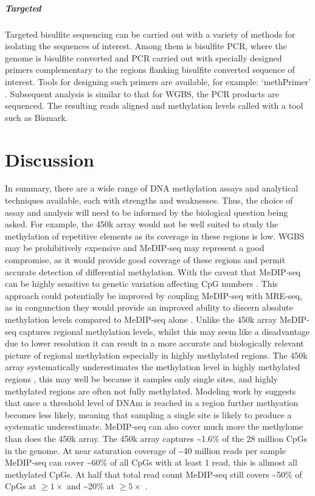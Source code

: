 \documentclass[]{book}
\let\oldsubparagraph\subparagraph
\renewcommand{\subparagraph}[1]{\oldsubparagraph{#1}\mbox{}}
\begin{document}
\hypertarget{targeted}{%
\subparagraph{Targeted}\label{targeted}}

Targeted bisulfite sequencing can be carried out with a variety of methods for isolating the sequences of interest. Among them is bisulfite PCR, where the genome is bisulfite converted and PCR carried out with specially designed primers complementary to the regions flanking bisulfite converted sequence of interest. Tools for designing such primers are available, for example: `methPrimer' \citep{Li2002}. Subsequent analysis is similar to that for WGBS, the PCR products are sequenced. The resulting reads aligned and methylation levels called with a tool such as Bismark.

\hypertarget{discussion}{%
\section{Discussion}\label{discussion}}

In summary, there are a wide range of DNA methylation assays and analytical techniques available, each with strengths and weaknesses. Thus, the choice of assay and analysis will need to be informed by the biological question being asked. For example, the 450k array would not be well suited to study the methylation of repetitive elements as its coverage in these regions is low. WGBS may be prohibitively expensive and MeDIP-seq may represent a good compromise, as it would provide good coverage of these regions and permit accurate detection of differential methylation. With the caveat that MeDIP-seq can be highly sensitive to genetic variation affecting CpG numbers \citep{Okitsu2015a}. This approach could potentially be improved by coupling MeDIP-seq with MRE-seq, as in congunction they would provide an improved ability to discern absolute methylation levels compared to MeDIP-seq alone \citep[\citet{Bock2010}]{Clark2012}. Unlike the 450k array MeDIP-seq captures regional methylation levels, whilst this may seem like a disadvantage due to lower resolution it can result in a more accurate and biologically relevant picture of regional methylation especially in highly methylated regions. The 450k array systematically underestimates the methylation level in highly methylated regions \citep{Clark2012}, this may well be because it samples only single sites, and highly methylated regions are often not fully methylated. Modeling work by \citet{Affinito2016} suggests that once a threshold level of DNAm is reached in a region further methyation becomes less likely, meaning that sampling a single site is likely to produce a systematic underestimate. MeDIP-seq can also cover much more the methylome than does the 450k array. The 450k array captures \textasciitilde1.6\% of the 28 million CpGs in the genome. At near saturation coverage of \textasciitilde40 million reads per sample MeDIP-seq can cover \textasciitilde60\% of all CpGs with at least 1 read, this is allmost all methylated CpGs. At half that total read count MeDIP-seq still covers \textasciitilde50\% of CpGs at \(\ge1\times\) and \textasciitilde20\% at \(\ge5\times\) \citep{Taiwo2012}.
\end{document}
